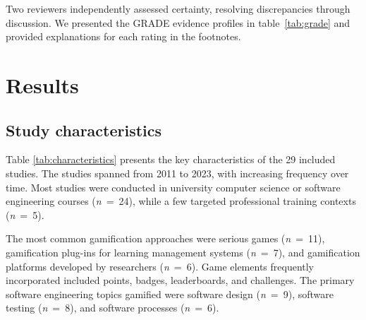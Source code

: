 \documentclass[
	hf,
	]{ceurart}
\begin{document}
		Two reviewers independently assessed certainty, resolving discrepancies through discussion. We presented the GRADE evidence profiles in table~\ref{tab:grade} and provided explanations for each rating in the footnotes.
		
		\section{Results}
		
		\subsection{Study characteristics}
		
		Table \ref{tab:characteristics} presents the key characteristics of the 29 included studies. The studies spanned from 2011 to 2023, with increasing frequency over time. Most studies were conducted in university computer science or software engineering courses (\textit{n}~=~24), while a few targeted professional training contexts (\textit{n}~=~5).  
		
		The most common gamification approaches were serious games (\textit{n}~=~11), gamification plug-ins for learning management systems (\textit{n}~=~7), and gamification platforms developed by researchers (\textit{n}~=~6). Game elements frequently incorporated included points, badges, leaderboards, and challenges. The primary software engineering topics gamified were software design (\textit{n}~=~9), software testing (\textit{n}~=~8), and software processes (\textit{n}~=~6).
		
\end{document}
